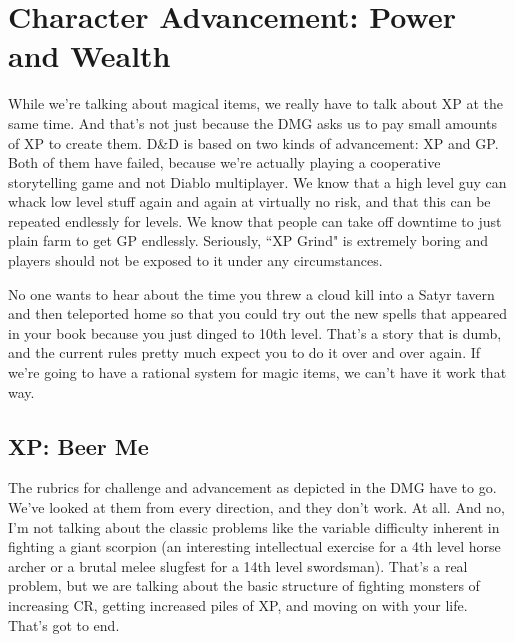 \section{Character Advancement: Power and Wealth}
\vspace*{-8pt}

While we're talking about magical items, we really have to talk about XP at the same time. And that's not just because the DMG asks us to pay small amounts of XP to create them. D\&D is based on two kinds of advancement: XP and GP. Both of them have failed, because we're actually playing a cooperative storytelling game and not Diablo multiplayer. We know that a high level guy can whack low level stuff again and again at virtually no risk, and that this can be repeated endlessly for levels. We know that people can take off downtime to just plain farm to get GP endlessly. Seriously, ``XP Grind" is extremely boring and players should not be exposed to it under any circumstances.

No one wants to hear about the time you threw a cloud kill into a Satyr tavern and then teleported home so that you could try out the new spells that appeared in your book because you just dinged to 10th level. That's a story that is dumb, and the current rules pretty much expect you to do it over and over again. If we're going to have a rational system for magic items, we can't have it work that way.

\subsection{XP: Beer Me}
\vspace*{-8pt}

The rubrics for challenge and advancement as depicted in the DMG have to go. We've looked at them from every direction, and they don't work. At all. And no, I'm not talking about the classic problems like the variable difficulty inherent in fighting a giant scorpion (an interesting intellectual exercise for a 4th level horse archer or a brutal melee slugfest for a 14th level swordsman). That's a real problem, but we are talking about the basic structure of fighting monsters of increasing CR, getting increased piles of XP, and moving on with your life. That's got to end.

